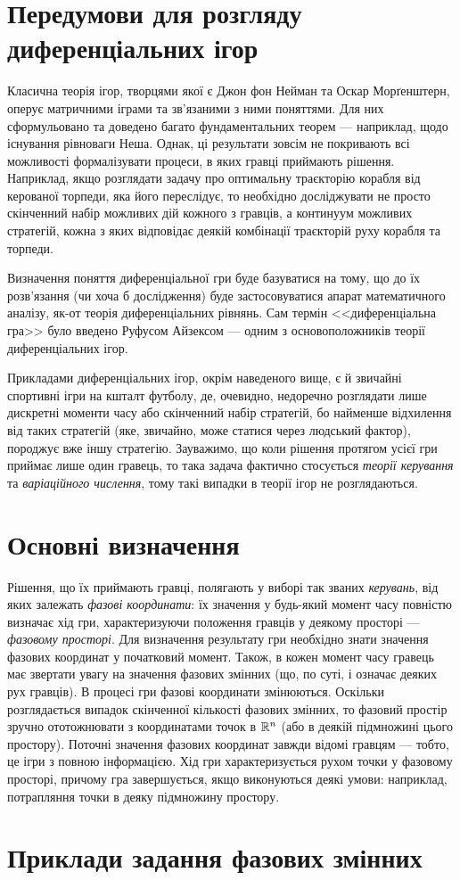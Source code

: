 
\section{Передумови для розгляду диференціальних ігор}
Класична теорія ігор, творцями якої є Джон фон Нейман та Оскар Морґенштерн,
оперує матричними іграми та зв'язаними з ними поняттями. Для них сформульовано та доведено
багато фундаментальних теорем --- наприклад, щодо існування рівноваги Неша. 
Однак, ці результати зовсім не покривають всі можливості формалізувати процеси,
в яких гравці приймають рішення. Наприклад, якщо розглядати задачу про оптимальну траєкторію 
корабля від керованої торпеди, яка його переслідує, то необхідно досліджувати не просто скінченний набір можливих дій
кожного з гравців, а континуум можливих стратегій, кожна з яких відповідає деякій комбінації траєкторій руху корабля та торпеди.

Визначення поняття диференціальної гри буде базуватися на тому, що до їх розв'язання (чи хоча б дослідження)
буде застосовуватися апарат математичного аналізу, як-от теорія диференціальних рівнянь.
Сам термін <<диференціальна гра>> було введено Руфусом Айзексом --- одним з основоположників теорії диференціальних ігор.

Прикладами диференціальних ігор, окрім наведеного вище, є й звичайні спортивні ігри на кшталт футболу,
де, очевидно, недоречно розглядати лише дискретні моменти часу або скінченний набір стратегій,
бо найменше відхилення від таких стратегій (яке, звичайно, може статися через людський фактор),
породжує вже іншу стратегію. Зауважимо, що коли рішення протягом усієї гри приймає лише один гравець,
то така задача фактично стосується \emph{теорії керування} та \emph{варіаційного числення}, тому такі випадки в
теорії ігор не розглядаються. 

\section{Основні визначення}
Рішення, що їх приймають гравці, полягають у виборі так званих \emph{керувань}, від яких залежать
\emph{фазові координати}: їх значення у будь-який момент часу повністю визначає хід гри, характеризуючи
положення гравців у деякому просторі --- \emph{фазовому просторі}.
Для визначення результату гри необхідно знати значення фазових координат у початковий момент. Також, в кожен момент часу
гравець має звертати увагу на значення фазових змінних (що, по суті, і означає деяких рух гравців).
В процесі гри фазові координати змінюються. Оскільки розглядається випадок скінченної кількості фазових змінних,
то фазовий простір зручно ототожнювати з координатами точок в $\mathbb{R}^n$ (або в деякій підмножині цього простору).
Поточні значення фазових координат завжди відомі гравцям --- тобто, це ігри з повною інформацією.
Хід гри характеризується рухом точки у фазовому просторі, причому гра завершується, якщо виконуються деякі умови: наприклад,
потрапляння точки в деяку підмножину простору.

\section{Приклади задання фазових змінних}
